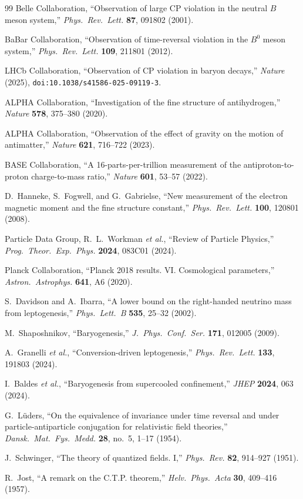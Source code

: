 \documentclass[12pt]{article}
\theoremstyle{definition}
\theoremstyle{remark}
\begin{document}
\begin{thebibliography}{99}
Belle Collaboration, ``Observation of large CP violation in the neutral $B$ meson system,''
\textit{Phys.\ Rev.\ Lett.} \textbf{87}, 091802 (2001).

BaBar Collaboration, ``Observation of time-reversal violation in the $B^0$ meson system,''
\textit{Phys.\ Rev.\ Lett.} \textbf{109}, 211801 (2012).

LHCb Collaboration, ``Observation of CP violation in baryon decays,''
\textit{Nature} (2025), \texttt{doi:10.1038/s41586-025-09119-3}.

ALPHA Collaboration, ``Investigation of the fine structure of antihydrogen,''
\textit{Nature} \textbf{578}, 375--380 (2020).

ALPHA Collaboration, ``Observation of the effect of gravity on the motion of antimatter,''
\textit{Nature} \textbf{621}, 716--722 (2023).

BASE Collaboration, ``A 16-parts-per-trillion measurement of the antiproton-to-proton
charge-to-mass ratio,'' \textit{Nature} \textbf{601}, 53--57 (2022).

D.~Hanneke, S.~Fogwell, and G.~Gabrielse,
``New measurement of the electron magnetic moment and the fine structure constant,''
\textit{Phys.\ Rev.\ Lett.} \textbf{100}, 120801 (2008).

Particle Data Group, R.~L.~Workman \textit{et al.},
``Review of Particle Physics,''
\textit{Prog.\ Theor.\ Exp.\ Phys.} \textbf{2024}, 083C01 (2024).

Planck Collaboration, ``Planck 2018 results. VI. Cosmological parameters,''
\textit{Astron.\ Astrophys.} \textbf{641}, A6 (2020).

S.~Davidson and A.~Ibarra, ``A lower bound on the right-handed neutrino mass from
leptogenesis,'' \textit{Phys.\ Lett.\ B} \textbf{535}, 25--32 (2002).

M.~Shaposhnikov, ``Baryogenesis,''
\textit{J.\ Phys.\ Conf.\ Ser.} \textbf{171}, 012005 (2009).

A.~Granelli \textit{et al.}, ``Conversion-driven leptogenesis,''
\textit{Phys.\ Rev.\ Lett.} \textbf{133}, 191803 (2024).

I.~Baldes \textit{et al.}, ``Baryogenesis from supercooled confinement,''
\textit{JHEP} \textbf{2024}, 063 (2024).

G.~L\"uders, ``On the equivalence of invariance under time reversal and under
particle-antiparticle conjugation for relativistic field theories,''
\textit{Dansk.\ Mat.\ Fys.\ Medd.} \textbf{28}, no.~5, 1--17 (1954).

J.~Schwinger, ``The theory of quantized fields. I,''
\textit{Phys.\ Rev.} \textbf{82}, 914--927 (1951).

R.~Jost, ``A remark on the C.T.P. theorem,''
\textit{Helv.\ Phys.\ Acta} \textbf{30}, 409--416 (1957).

\end{thebibliography}
\end{document}
